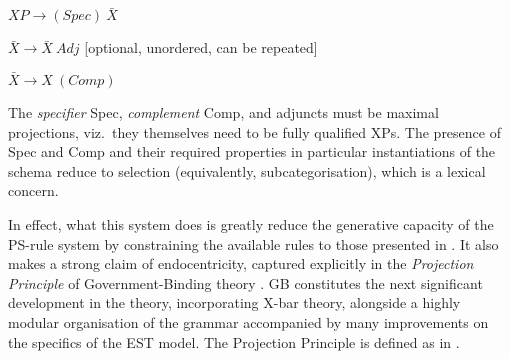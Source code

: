 \begin{subexamples}\label{ex:xbarrules}
    \item $XP \rightarrow (Spec)\ \bar{X}$
    \item $\bar{X} \rightarrow \bar{X}\ Adj$ [optional, unordered, can be repeated]
    \item $\bar{X} \rightarrow X\ (Comp)$
\end{subexamples}
\noindent
The \textit{specifier} Spec, \textit{complement} Comp, and adjuncts must be maximal projections, viz.~they themselves need to be fully qualified XPs. The presence of Spec and Comp and their required properties in particular instantiations of the schema reduce to selection (equivalently, subcategorisation), which is a lexical concern.

In effect, what this system does is greatly reduce the generative capacity of the PS-rule system by constraining the available rules to those presented in . It also makes a strong claim of endocentricity, captured explicitly in the \textit{Projection Principle} of Government-Binding theory \parencite[GB;][x]{ChomskyN_1981}. GB constitutes the next significant development in the theory, incorporating X-bar theory, alongside a highly modular organisation of the grammar accompanied by many improvements on the specifics of the EST model. The Projection Principle is defined as in .

